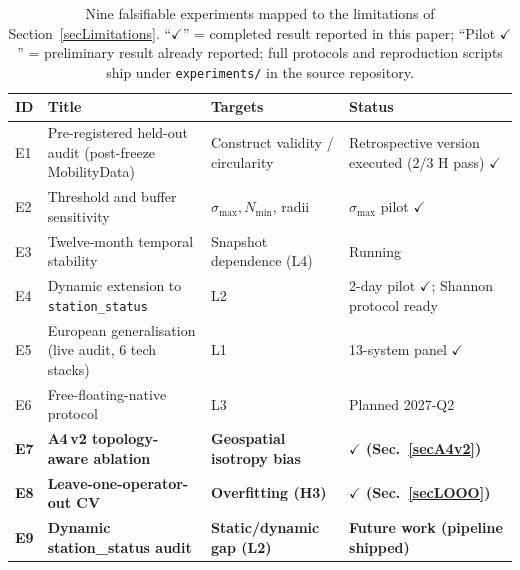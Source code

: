 \documentclass[11pt,a4paper]{article}
\begin{document}
\begin{table}[!htbp]
\centering
\caption{Nine falsifiable experiments mapped to the limitations of
Section~\ref{secLimitations}. ``$\checkmark$'' = completed result
reported in this paper; ``Pilot $\checkmark$'' = preliminary result
already reported; full protocols and reproduction scripts ship under
\texttt{experiments/} in the source repository.}
\label{tab:roadmap}
\small
\begin{tabular}{@{}llll@{}}
\toprule
\textbf{ID} & \textbf{Title} & \textbf{Targets} & \textbf{Status}\\
\midrule
E1 & Pre-registered held-out audit (post-freeze MobilityData) & Construct validity / circularity & Retrospective version executed (2/3 H pass) $\checkmark$ \\
E2 & Threshold and buffer sensitivity           & $\sigma_{\max}, N_{\min}$, radii & $\sigma_{\max}$ pilot $\checkmark$ \\
E3 & Twelve-month temporal stability            & Snapshot dependence (L4)    & Running \\
E4 & Dynamic extension to \texttt{station\_status} & L2                       & 2-day pilot $\checkmark$; Shannon protocol ready \\
E5 & European generalisation (live audit, 6 tech stacks) & L1                  & 13-system panel $\checkmark$ \\
E6 & Free-floating-native protocol              & L3                          & Planned 2027-Q2 \\
\textbf{E7} & \textbf{A4\,v2 topology-aware ablation} & \textbf{Geospatial isotropy bias} & \textbf{$\checkmark$ (Sec.~\ref{secA4v2})} \\
\textbf{E8} & \textbf{Leave-one-operator-out CV}       & \textbf{Overfitting (H3)}          & \textbf{$\checkmark$ (Sec.~\ref{secLOOO})} \\
\textbf{E9} & \textbf{Dynamic station\_status audit} & \textbf{Static/dynamic gap (L2)}  & \textbf{Future work (pipeline shipped)} \\
\bottomrule
\end{tabular}
\end{table}
\end{document}
